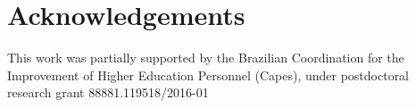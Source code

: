 \section{Acknowledgements}
\label{sec:Agradecimentos}
This work was partially supported by the Brazilian Coordination for the Improvement of Higher Education Personnel (Capes), under postdoctoral research grant 88881.119518/2016-01 ​